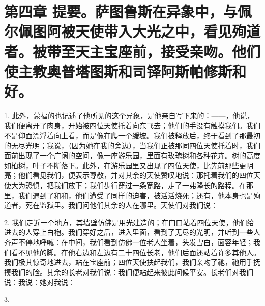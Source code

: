 
\section{第四章 提要。萨图鲁斯在异象中，与佩尔佩图阿被天使带入大光之中，看见殉道者。被带至天主宝座前，接受亲吻。他们使主教奥普塔图斯和司铎阿斯帕修斯和好。}

1. 此外，蒙福的也记述了他所见的这个异象，是他亲自写下来的：——，他说，我们便离开了肉身，开始被四位天使托着向东飞去；他们的手没有触摸我们。我们不是仰面漂浮着向上看，而是像在爬一个缓坡。我们被释放后，终于看到了那最初的无尽光明；我说，（因为她在我的旁边），当我们正被那同四位天使托着时，我们面前出现了一个广阔的空间，像一座游乐园，里面有玫瑰树和各种花卉。树的高度如柏树，叶子不断落下。此外，在游乐园里又出现了四位天使，比先前那些更明亮；他们看见我们，便表示尊敬，并对其余的天使赞叹地说：那托着我们的四位天使大为恐惧，把我们放下；我们步行穿过一条宽路，走了一弗隆长的路程。在那里，我们遇到了和和，他们遭受了同样的迫害，被活活烧死；还有，他本身也是殉道者，死在监狱里。我们问他们其余的人在哪里。天使们对我们说：\par

2. 我们走近一个地方，其墙壁仿佛是用光建造的；在门口站着四位天使，他们给进去的人穿上白袍。我们穿好之后，进入里面，看到了无尽的光明，并听到一些人齐声不停地呼喊：在中间，我们看到仿佛一位老人坐着，头发雪白，面容年轻；我们看不见他的脚。在他右边和左边有二十四位长老，他们后面还站着许多其他人。我们极其惊奇地进去，站在宝座前；四位天使扶起我们，我们亲吻了祂，祂用手抚摸我们的脸。其余的长老对我们说：我们便站起来彼此问候平安。长老们对我们说：我说：她对我说：\par

3. \par

